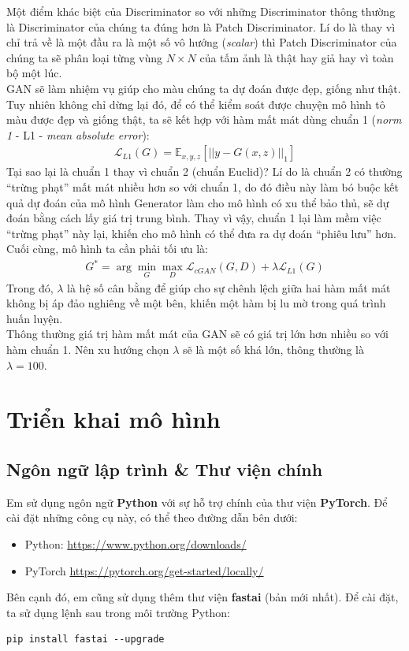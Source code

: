 \documentclass[a4paper]{article}
\begin{document}
\noindent
Một điểm khác biệt của Discriminator so với những Discriminator thông thường là Discriminator của chúng ta đúng hơn là Patch Discriminator. Lí do là thay vì chỉ trả về là một đầu ra là một số vô hướng (\textit{scalar}) thì Patch Discriminator của chúng ta sẽ phân loại từng vùng $N \times N$ của tấm ảnh là thật hay giả hay vì toàn bộ một lúc.\\

\noindent
GAN sẽ làm nhiệm vụ giúp cho màu chúng ta dự đoán được đẹp, giống như thật. Tuy nhiên không chỉ dừng lại đó, để có thể kiểm soát được chuyện mô hình tô màu được đẹp và giống thật, ta sẽ kết hợp với hàm mất mát dùng chuẩn 1 (\textit{norm 1} - L1 - \textit{mean absolute error}):
\begin{align*}
    \mathcal{L}_{L1}(G) = \mathbb{E}_{x, y, z}\left[\left|\left|y - G(x, z)\right|\right|_1\right]
\end{align*}
Tại sao lại là chuẩn 1 thay vì chuẩn 2 (chuẩn Euclid)? Lí do là chuẩn 2 có thường ``trừng phạt'' mất mát nhiều hơn so với chuẩn 1, do đó điều này làm bó buộc kết quả dự đoán của mô hình Generator làm cho mô hình có xu thể bảo thủ, sẽ dự đoán bằng cách lấy giá trị trung bình. Thay vì vậy, chuẩn 1 lại làm mềm việc ``trừng phạt'' này lại, khiến cho mô hình có thể đưa ra dự đoán ``phiêu lưu'' hơn. \\
Cuối cùng, mô hình ta cần phải tối ưu là:
\begin{align*}
    G^* = \arg\underset{G}{\min}\underset{D}{\max}\mathcal{L}_{cGAN}(G, D) + \lambda \mathcal{L}_{L1}(G)
\end{align*}
Trong đó, $\lambda$ là hệ số cân bằng để giúp cho sự chênh lệch giữa hai hàm mất mát không bị áp đảo nghiêng về một bên, khiến một hàm bị lu mờ trong quá trình huấn luyện.\\
Thông thường giá trị hàm mất mát của GAN sẽ có giá trị lớn hơn nhiều so với hàm chuẩn 1. Nên xu hướng chọn $\lambda$ sẽ là một số khá lớn, thông thường là $\lambda = 100$.

\section{Triển khai mô hình}

\subsection{Ngôn ngữ lập trình \& Thư viện chính}
Em sử dụng ngôn ngữ \textbf{Python} với sự hỗ trợ chính của thư viện \textbf{PyTorch}. Để cài đặt những công cụ này, có thể theo đường dẫn bên dưới:
\begin{itemize}
    \item Python: \href{https://www.python.org/downloads/}{https://www.python.org/downloads/}
    \item PyTorch \href{https://pytorch.org/get-started/locally/}{https://pytorch.org/get-started/locally/}
\end{itemize}
Bên cạnh đó, em cũng sử dụng thêm thư viện \textbf{fastai} (bản mới nhất). Để cài đặt, ta sử dụng lệnh sau trong môi trường Python:
\begin{lstlisting}
pip install fastai --upgrade
\end{lstlisting}
\end{document}
